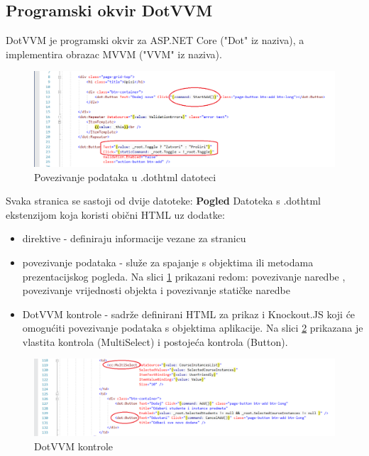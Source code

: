 \documentclass[times, utf8, diplomski]{fer}
\begin{document}
\subsection{Programski okvir DotVVM}
DotVVM je programski okvir za ASP.NET Core ("Dot" iz naziva), a implementira obrazac MVVM ("VVM" iz naziva).

\begin{figure}[htb]
\centering
\includegraphics[width=12cm]{code_dothtml3.PNG}
\caption{Povezivanje podataka u .dothtml datoteci}
\label{fig:binding}
\end{figure}

Svaka stranica se sastoji od dvije datoteke:
\hfill\break
\hfill\break
\textbf{Pogled } \hfill\break
Datoteka s .dothtml ekstenzijom koja koristi obični HTML uz dodatke:
\begin{itemize}
    \item direktive - definiraju informacije vezane za stranicu %
    \item povezivanje podataka  - služe za spajanje s objektima ili metodama prezentacijskog pogleda. Na slici \ref{fig:binding} prikazani redom: povezivanje naredbe , povezivanje vrijednosti objekta  i povezivanje statičke naredbe 
    \item DotVVM kontrole - sadrže definirani HTML za prikaz i Knockout.JS koji će omogućiti povezivanje podataka s objektima aplikacije. Na slici \ref{fig:controls} prikazana je vlastita kontrola (MultiSelect) i postojeća kontrola (Button).
\end{itemize}{}


\begin{figure}[htb]
\centering
\includegraphics[width=12cm]{code_dothtml4.PNG}
\caption{DotVVM kontrole}
\label{fig:controls}
\end{figure}
\end{document}

